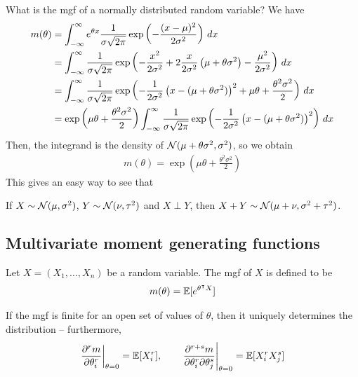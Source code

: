 \documentclass{../template/note}
\begin{document}
    What is the mgf of a normally distributed random variable? We have
    \begin{align*}
        m(\theta) &= \int_{-\infty}^\infty e^{\theta x} \frac{1}{\sigma \sqrt{2\pi}} \exp\left(-\frac{(x-\mu)^2}{2\sigma^2}\right) \,d{x} \\
        &= \int_{-\infty}^\infty \frac{1}{\sigma \sqrt{2\pi}} \exp\left(-\frac{x^2}{2\sigma^2}+2\frac{x}{2\sigma^2}\left(\mu+\theta\sigma^2\right)-\frac{\mu^2}{2\sigma^2}\right) \,d{x} \\
        &= \int_{-\infty}^\infty \frac{1}{\sigma \sqrt{2\pi}} \exp\left(-\frac 1{2\sigma^2}\left(x-(\mu+\theta\sigma^2)\right)^2+\mu\theta+\frac{\theta^2\sigma^2}2\right) \,d{x} \\
        &= \exp\left(\mu\theta + \frac{\theta^2\sigma^2}2\right) \int_{-\infty}^\infty \frac{1}{\sigma \sqrt{2\pi}} \exp\left(-\frac 1{2\sigma^2}\left(x-(\mu+\theta\sigma^2)\right)^2\right) \,d{x}
    \end{align*}
    Then, the integrand is the density of \(\mathcal{N}(\mu+\theta\sigma^2, \sigma^2)\), so we obtain
    \begin{align*}
        m(\theta) = \exp\left(\mu\theta + \frac{\theta^2\sigma^2}{2}\right)
    \end{align*}
    This gives an easy way to see that
    \begin{proposition}
        If \(X \sim \mathcal{N}(\mu, \sigma^2)\), \(Y \sim \mathcal{N}(\nu, \tau^2)\) and \(X \perp Y\), then \(X + Y \sim \mathcal{N}(\mu+\nu, \sigma^2+\tau^2)\).
    \end{proposition}
    
    \subsection{Multivariate moment generating functions}

    \begin{definition}
        Let \(X = (X_1, \dots, X_n)\) be a random variable. The mgf of \( X\) is defined to be
        \begin{align*}
            m( \theta) = \mathbb E[e^{ \theta^\intercal  X}]
        \end{align*}
    \end{definition}
    
    \begin{theorem}
        If the mgf is finite for an open set of values of \( \theta\), then it uniquely determines the distribution -- furthermore,
        \begin{align*}
            \pd[\theta=0]{^r m}{\theta_i^r} = \EE[X_i^r], \qquad \pd[\theta=0]{^{r+s}m}{\theta_i^r \pr \theta_j^s} = \EE[X_i^r X_j^s]
        \end{align*}
    \end{theorem}
    
\end{document}
